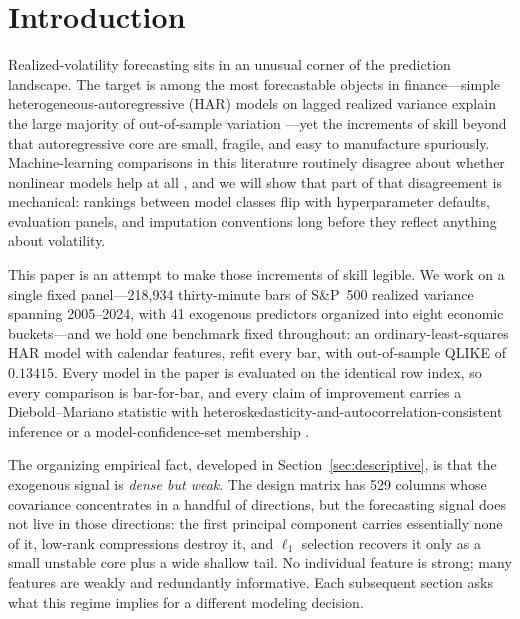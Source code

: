 \section{Introduction}
\label{sec:introduction}

Realized-volatility forecasting sits in an unusual corner of the prediction landscape. The target is among the most forecastable objects in finance---simple heterogeneous-autoregressive (HAR) models on lagged realized variance explain the large majority of out-of-sample variation \citep{Corsi2009, AndersenBollerslevDieboldLabys2003}---yet the increments of skill beyond that autoregressive core are small, fragile, and easy to manufacture spuriously. Machine-learning comparisons in this literature routinely disagree about whether nonlinear models help at all \citep{christensen2023machine, gu2020empirical}, and we will show that part of that disagreement is mechanical: rankings between model classes flip with hyperparameter defaults, evaluation panels, and imputation conventions long before they reflect anything about volatility.

This paper is an attempt to make those increments of skill legible. We work on a single fixed panel---218{,}934 thirty-minute bars of S\&P~500 realized variance spanning 2005--2024, with 41 exogenous predictors organized into eight economic buckets---and we hold one benchmark fixed throughout: an ordinary-least-squares HAR model with calendar features, refit every bar, with out-of-sample QLIKE of $0.13415$. Every model in the paper is evaluated on the identical row index, so every comparison is bar-for-bar, and every claim of improvement carries a Diebold--Mariano statistic with heteroskedasticity-and-autocorrelation-consistent inference \citep{DieboldMariano1995, HarveyLeybourneNewbold1997} or a model-confidence-set membership \citep{HansenLundeNason2011}.

The organizing empirical fact, developed in Section~\ref{sec:descriptive}, is that the exogenous signal is \emph{dense but weak}. The design matrix has 529 columns whose covariance concentrates in a handful of directions, but the forecasting signal does not live in those directions: the first principal component carries essentially none of it, low-rank compressions destroy it, and $\ell_1$ selection recovers it only as a small unstable core plus a wide shallow tail. No individual feature is strong; many features are weakly and redundantly informative. Each subsequent section asks what this regime implies for a different modeling decision.

